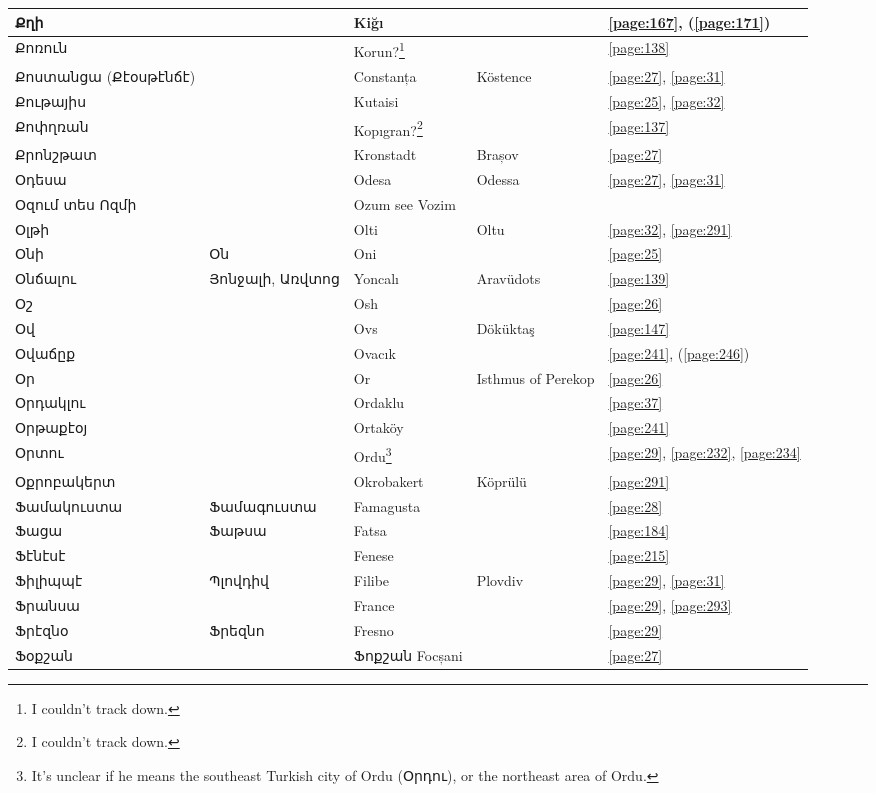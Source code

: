 \begin{center}
\begin{longtable}{|p{}|p{3cm}|p{3cm}|p{2cm}|p{3cm}|}
	Քղի& &Kiğı & &\ref{page:167}, (\ref{page:171})\\ \hline
	Քոռուն& & Korun?\footnote{I couldn't track down.}& &\ref{page:138}\\ \hline
	Քոստանցա (Քէօսթէնճէ)&& Constanța& Köstence&   \ref{page:27}, \ref{page:31}\\ \hline
	Քութայիս& & Kutaisi& &\ref{page:25}, \ref{page:32}\\ \hline
	Քոփղռան& &Kopıgran?\footnote{I couldn't track down.} & &\ref{page:137}\\ \hline
	Քրոնշթատ& & Kronstadt& Brașov &\ref{page:27}\\ \hline
	Օդեսա& &Odesa &Odessa &\ref{page:27}, \ref{page:31}\\ \hline
	Օզում տես Ոզմի& &Ozum see Vozim & &\\ \hline
	Օլթի& & Olti &Oltu &\ref{page:32}, \ref{page:291}\\ \hline
	Օնի& Օն&Oni & &\ref{page:25}\\ \hline
	Օնճալու&Յոնջալի, Առվտոց &Yoncalı &Aravüdots &\ref{page:139}\\ \hline
	Օշ& & Osh& &\ref{page:26}\\ \hline
	Օվ& &Ovs & Döküktaş&\ref{page:147}\\ \hline
	Օվաճըք& & Ovacık& &\ref{page:241}, (\ref{page:246})\\ \hline
	Օր& &  Or&Isthmus of Perekop &\ref{page:26}\\ \hline
	Օրդակլու& &Ordaklu & &\ref{page:37}\\ \hline
	Օրթաքէօյ& &Ortaköy & &\ref{page:241}\\ \hline
	Օրտու& & Ordu\footnote{It's unclear if he means the southeast Turkish city of Ordu (Օրդու), or the northeast area of Ordu.}& &\ref{page:29}, \ref{page:232}, \ref{page:234}\\ \hline
	Օքրոբակերտ& & Okrobakert&Köprülü &\ref{page:291}\\ \hline
	Ֆամակուստա& Ֆամագուստա&Famagusta & &\ref{page:28}\\ \hline
	Ֆացա&Ֆաթսա &Fatsa & &\ref{page:184}\\ \hline
	Ֆէնէսէ& & Fenese& &\ref{page:215}\\ \hline
	Ֆիլիպպէ& Պլովդիվ&Filibe &Plovdiv &\ref{page:29}, \ref{page:31}\\ \hline
	Ֆրանսա& &France & &\ref{page:29}, \ref{page:293}\\ \hline
	Ֆրէզնօ&   Ֆրեզնո & Fresno& &\ref{page:29}\\ \hline
	Ֆօքշան& &Ֆոքշան Focșani& &\ref{page:27}\\ \hline
	\hline
 \end{longtable}
\end{center}



